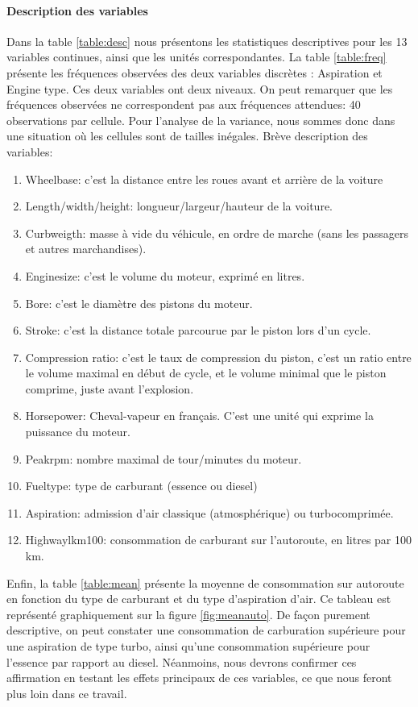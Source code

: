 \documentclass[11pt,a4paper]{article}
\begin{document}
\paragraph{Description des variables} 
Dans la table \ref{table:desc} nous présentons les statistiques descriptives pour les 13 variables continues, ainsi que les unités correspondantes. La table \ref{table:freq} présente les fréquences observées des deux variables discrètes : Aspiration et Engine type. Ces deux variables ont deux niveaux. On peut remarquer que les fréquences observées ne correspondent pas aux fréquences attendues: 40 observations par cellule. Pour l'analyse de la variance, nous sommes donc dans une situation où les cellules sont de tailles inégales.
Brève description des variables:
\begin{enumerate}
\item Wheelbase: c'est la distance entre les roues avant et arrière de la voiture
\item Length/width/height: longueur/largeur/hauteur de la voiture.
\item Curbweigth: masse à vide du véhicule, en ordre de marche (sans les passagers et autres marchandises).
\item Enginesize: c'est le volume du moteur, exprimé en litres.
\item Bore: c'est le diamètre des pistons du moteur.
\item Stroke: c'est la distance totale parcourue par le piston lors d'un cycle.
\item Compression ratio: c'est le taux de compression du piston, c'est un ratio entre le volume maximal en début de cycle, et le volume minimal que le piston comprime, juste avant l'explosion.
\item Horsepower: Cheval-vapeur en français. C'est une unité qui exprime la puissance du moteur.
\item Peakrpm: nombre maximal de tour/minutes du moteur.
\item Fueltype: type de carburant (essence ou diesel)
\item Aspiration: admission d'air classique (atmosphérique) ou turbocomprimée.
\item Highwaylkm100: consommation de carburant sur l'autoroute, en litres par 100 km.

\end{enumerate}





Enfin, la table \ref{table:mean} présente la moyenne de consommation sur autoroute en fonction du type de carburant et du type d'aspiration d'air.
Ce tableau est représenté graphiquement sur la figure \ref{fig:meanauto}. De façon purement descriptive, on peut constater une consommation de carburation supérieure pour une aspiration de type turbo, ainsi qu'une consommation supérieure pour l'essence par rapport au diesel. Néanmoins,  nous devrons confirmer ces affirmation en testant les effets principaux de ces variables, ce que nous feront plus loin dans ce travail.
\end{document}

